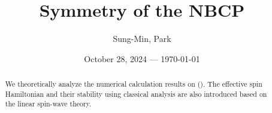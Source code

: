 \documentclass[aps, prx, nofootinbib, preprintnumbers, superscriptaddress]{revtex4-2}
\begin{document}
\title{Symmetry of the NBCP}
\author{Sung-Min, Park}
\begin{abstract}
    We theoretically analyze the numerical calculation results on {\NBCPatom} 
    ({\NBCP}). 
    The effective spin Hamiltonian and their stability using classical analysis are also introduced based on the linear spin-wave theory.
\end{abstract}
\date{October 28, 2024 --- \today}


\maketitle

 



\end{document}
